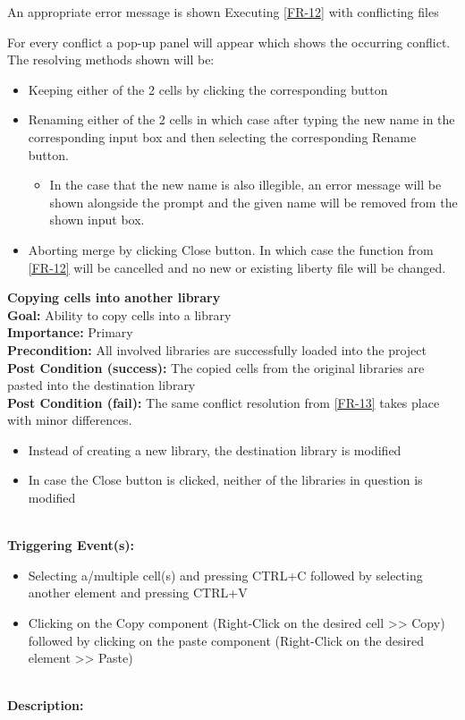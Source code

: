 \documentclass[10pt,a4paper]{report}
\newcommand{\precondition}[1]{
    \textbf{Precondition: } #1 \leavevmode \\
}
\newcommand{\FRDescription}[8]{
    \textbf{#1} \leavevmode \\
    \textbf{Goal: } #2 \leavevmode \\
    \textbf{Importance: } #3 \leavevmode \\
    \precondition{#4}
    \textbf{Post Condition (success): } #5 \leavevmode \\
    \textbf{Post Condition (fail): } #6 \leavevmode \\
    \textbf{Triggering Event(s): } #7 \leavevmode \\
    \textbf{Description: } \leavevmode \\ 
    #8}
\begin{document}
\begin{FR}
    {An appropriate error message is shown}
    {Executing \ref{FR-12} with conflicting files}
    {For every conflict a pop-up panel will appear which shows the occurring conflict. The resolving methods shown will be:
    \begin{itemize}
    \item Keeping either of the 2 cells by clicking the corresponding button
    \item Renaming either of the 2 cells in which case after typing the new name in the corresponding input box and then selecting the corresponding Rename button.
        \begin{itemize}
        \item In the case that the new name is also illegible, an error message will be shown alongside the prompt and the given name will be removed from the shown input box.
        \end{itemize}
    \item Aborting merge by clicking Close button. In which case the function from \ref{FR-12} will be cancelled and no new or existing liberty file will be changed.
\end{itemize}}
    \item \FRDescription{Copying cells into another library\label{FR-14}}
    {Ability to copy cells into a library}
    {Primary} 
    {All involved libraries are successfully loaded into the project}
    {The copied cells from the original libraries are pasted into the destination library}
    {The same conflict resolution from \ref{FR-13} takes place with minor differences.
    \begin{itemize}
        \item Instead of creating a new library, the destination library is modified
        \item In case the Close button is clicked, neither of the libraries in question is modified
    \end{itemize}}
    {\begin{itemize}
        \item Selecting a/multiple cell(s) and pressing CTRL+C followed by selecting another element and pressing CTRL+V
        \item Clicking on the Copy component (Right-Click on the desired cell >> Copy) followed by clicking on the paste component (Right-Click on the desired element >> Paste)
    \end{itemize}}
    \item {}

\end{FR}
\end{document}
